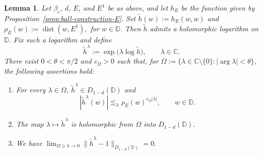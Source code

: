 \documentclass[a4paper,12pt]{amsart}
\newtheorem{lem}[thm]{Lemma}
\theoremstyle{definition}
\begin{document}
\begin{lem}\label{lem:one-variable-deformation}
Let $\beta_c$, $d$, $E$, and $E^1$ be as above, and let $h_E$ be
the function given by Proposition~\ref{prop:ball-construction-E}. Set
$\widetilde h(w):=h_E(w,w)$ and $\rho_E(w):=\operatorname{dist}(w,E^1),$ for $w\in\mathbb{D}.$
Then $\widetilde h$ admits a holomorphic logarithm on $\mathbb D.$
Fix such a logarithm and define
\[
    \widetilde h^\lambda
    :=\exp\bigl(\lambda\log\widetilde h\bigr),
    \qquad \lambda\in\mathbb C.
\]
There exist $0<\theta<\pi/2$ and $c_\Omega>0$ such that, for
$\Omega:=\{\lambda\in\mathbb C\setminus\{0\}:|\arg\lambda|<\theta\},$
the following assertions hold:
\begin{enumerate}
    \item For every $\lambda\in\Omega$,
    $
        \widetilde h^\lambda\in D_{1-d}(\mathbb D)
    $
    and
    \[
        |\widetilde h^\lambda(w)|
        \lesssim_\lambda
        \rho_E(w)^{c_\Omega|\lambda|},
        \qquad w\in\mathbb D.
    \]

    \item The map
    $
        \lambda\longmapsto\widetilde h^\lambda
    $
    is holomorphic from $\Omega$ into $D_{1-d}(\mathbb D)$.

    \item We have
    $
        \lim_{\Omega\ni\lambda\to0}
        \|\widetilde h^\lambda-1\|_{D_{1-d}(\mathbb D)}
        =0.
    $
\end{enumerate}
\end{lem}
\end{document}
